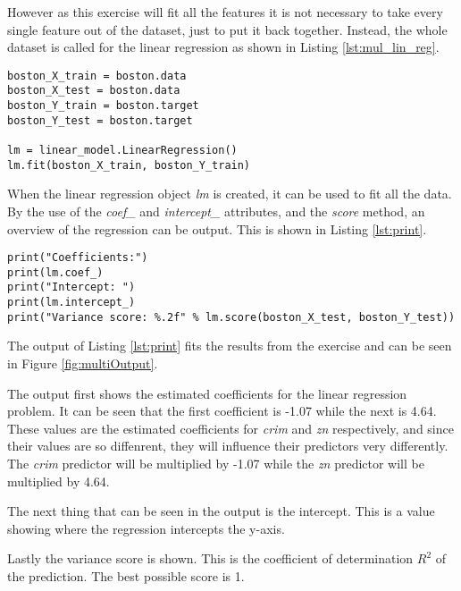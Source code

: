 However as this exercise will fit all the features it is not necessary to take every single feature out of the dataset, just to put it back together. Instead, the whole dataset is called for the linear regression as shown in Listing \ref{lst:mul_lin_reg}.

\begin{lstlisting}[caption={Linear Regression of multiple predictors}, label=lst:mul_lin_reg, mathescape=true]
boston_X_train = boston.data
boston_X_test = boston.data
boston_Y_train = boston.target
boston_Y_test = boston.target

lm = linear_model.LinearRegression()
lm.fit(boston_X_train, boston_Y_train)
\end{lstlisting}

When the linear regression object \emph{lm} is created, it can be used to fit all the data. By the use of the \emph{coef\_} and \emph{intercept\_} attributes, and the \emph{score} method, an overview of the regression can be output. This is shown in Listing \ref{lst:print}.

\begin{lstlisting}[caption={Printing regression overview}, label=lst:print, mathescape=true]
print("Coefficients:")
print(lm.coef_)
print("Intercept: ")
print(lm.intercept_)
print("Variance score: %.2f" % lm.score(boston_X_test, boston_Y_test))
\end{lstlisting}

The output of Listing \ref{lst:print} fits the results from the exercise and can be seen in Figure \ref{fig:multiOutput}.


The output first shows the estimated coefficients for the linear regression problem. It can be seen that the first coefficient is -1.07 while the next is 4.64. These values are the estimated coefficients for \emph{crim} and \emph{zn} respectively, and since their values are so diffenrent, they will influence their predictors very differently. The \emph{crim} predictor will be multiplied by -1.07 while the \emph{zn} predictor will be multiplied by 4.64. 

The next thing that can be seen in the output is the intercept. This is a value showing where the regression intercepts the y-axis. 

Lastly the variance score is shown. This is the coefficient of determination $R^2$ of the prediction. The best possible score is 1. 
